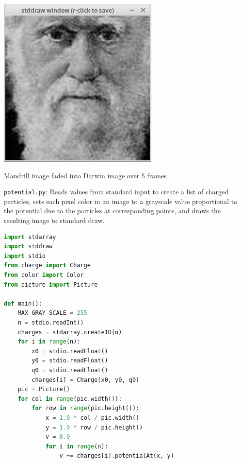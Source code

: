 \documentclass[8pt,a4paper,compress,handout]{beamer}
\begin{document}
\begin{frame}[fragile]
\begin{minipage}{300pt}
\begin{center}
\includegraphics[scale=0.15]{figures/fade6.png}

\smallskip

\tiny Mandrill image faded into Darwin image over 5 frames
\end{center}
\end{minipage}%
\end{frame}

\begin{frame}[fragile]
\begin{framed}
\tiny \lstinline{potential.py}: Reads values from standard input to create a list of charged particles, sets each pixel color in an image to a grayscale value proportional to the potential due to the particles at corresponding points, and draws the resulting image to standard draw.
\end{framed}

\begin{lstlisting}[language=Python]
import stdarray
import stddraw
import stdio
from charge import Charge
from color import Color
from picture import Picture

def main():
    MAX_GRAY_SCALE = 255
    n = stdio.readInt()
    charges = stdarray.create1D(n)
    for i in range(n):
        x0 = stdio.readFloat()
        y0 = stdio.readFloat()
        q0 = stdio.readFloat()
        charges[i] = Charge(x0, y0, q0)
    pic = Picture()
    for col in range(pic.width()):
        for row in range(pic.height()):
            x = 1.0 * col / pic.width()
            y = 1.0 * row / pic.height()
            v = 0.0
            for i in range(n):
                v += charges[i].potentialAt(x, y)    
\end{lstlisting}
\end{frame}
\end{document}
